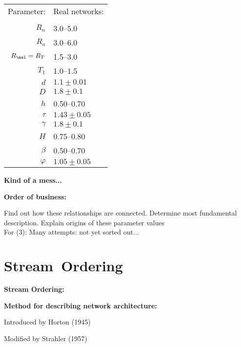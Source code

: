 \begin{frame}[label=]
\begin{frame}[label=]
\begin{frame}[label=]
\begin{frame}[label=]
\begin{frame}[label=]
\begin{frame}[label=]
\begin{frame}[label=]
\begin{frame}[label=]
\begin{frame}[label=]
\begin{frame}[label=]
  \begin{center}
    \begin{tabular}{rl}
      \alert{Parameter:}    & \alert{Real networks:}  \\
      &     \\
      $R_n$               & 3.0--5.0 \\
      $R_a$               & 3.0--6.0 \\
      $R_\msl=R_T$               & 1.5--3.0 \\
      $T_1$               & 1.0--1.5 \\
      ${d}$               & $1.1 \pm 0.01$ \\
      $D$                 & $1.8 \pm 0.1$ \\
      $h$                 & 0.50--0.70 \\
      $\tau$              & $1.43 \pm 0.05$ \\
      $\gamma$            & $1.8 \pm 0.1$ \\
      $H$                 & 0.75--0.80 \\
      $\beta$             & 0.50--0.70  \\
      $\varphi$           & $1.05 \pm 0.05$ \\
    \end{tabular}
  \end{center}


\begin{frame}[label=]
  \textbf{Kind of a mess...}

  \textbf{Order of business:}
    
     Find out how these relationships are connected.
     Determine most fundamental description.
     Explain origins of these parameter values  \\
      \bigskip
      {For (3): \alert{Many attempts: not yet sorted out...}}
    
  


\section{Stream\ Ordering}

\begin{frame}[label=]
  \textbf{Stream Ordering:}

  \textbf{Method for describing network architecture:}
    
    
      Introduced by Horton (1945)\cite{horton1945a}
     
      Modified by Strahler (1957)\cite{strahler1952a}
     

\end{frame}
\end{frame}
\end{frame}
\end{frame}
\end{frame}
\end{frame}
\end{frame}
\end{frame}
\end{frame}
\end{frame}
\end{frame}
\end{frame}
